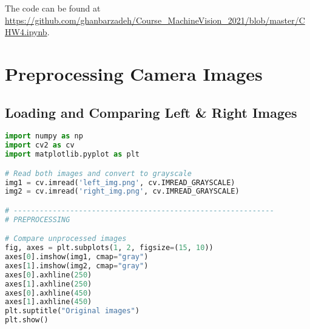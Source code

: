 \date{23 Jan, 2022} %







\maketitle 
The code can be found at \url{https://github.com/ghanbarzadeh/Course_MachineVision_2021/blob/master/CHW4.ipynb}.
\section*{Preprocessing Camera Images}

\subsection*{Loading and Comparing Left \& Right Images}

\begin{center}{\begin{minipage}{0.9\linewidth}
\begin{lstlisting}[language=Python, basicstyle=\fontsize{8}{10}\selectfont\ttfamily]
import numpy as np
import cv2 as cv
import matplotlib.pyplot as plt

# Read both images and convert to grayscale
img1 = cv.imread('left_img.png', cv.IMREAD_GRAYSCALE)
img2 = cv.imread('right_img.png', cv.IMREAD_GRAYSCALE)

# ------------------------------------------------------------
# PREPROCESSING

# Compare unprocessed images
fig, axes = plt.subplots(1, 2, figsize=(15, 10))
axes[0].imshow(img1, cmap="gray")
axes[1].imshow(img2, cmap="gray")
axes[0].axhline(250)
axes[1].axhline(250)
axes[0].axhline(450)
axes[1].axhline(450)
plt.suptitle("Original images")
plt.show()
\end{lstlisting}
\end{minipage}}\end{center}

